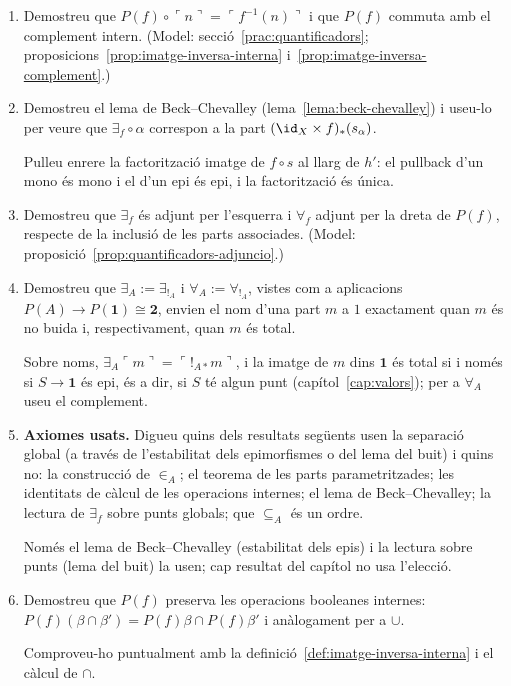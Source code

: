 \begin{enumerate}[resume]
  \item Demostreu que \(P(f)\circ\ulcorner n\urcorner=\ulcorner f^{-1}(n)\urcorner\) i que \(P(f)\) commuta amb el complement intern. (Model: secció~\ref{prac:quantificadors}; proposicions~\ref{prop:imatge-inversa-interna} i~\ref{prop:imatge-inversa-complement}.)

  \item Demostreu el lema de Beck--Chevalley (lema~\ref{lema:beck-chevalley}) i useu-lo per veure que \(\exists_f\circ\alpha\) correspon a la part \((\id_X\times f)_*(s_\alpha)\). \begin{indicacio}Pulleu enrere la factorització imatge de \(f\circ s\) al llarg de \(h'\): el pullback d'un mono és mono i el d'un epi és epi, i la factorització és única.\end{indicacio}

  \item Demostreu que \(\exists_f\) és adjunt per l'esquerra i \(\forall_f\) adjunt per la dreta de \(P(f)\), respecte de la inclusió de les parts associades. (Model: proposició~\ref{prop:quantificadors-adjuncio}.)

  \item Demostreu que \(\exists_A:=\exists_{{!}_A}\) i \(\forall_A:=\forall_{{!}_A}\), vistes com a aplicacions \(P(A)\to P(\mathbf1)\cong\mathbf2\), envien el nom d'una part \(m\) a \(1\) exactament quan \(m\) és no buida i, respectivament, quan \(m\) és total. \begin{indicacio}Sobre noms, \(\exists_A\ulcorner m\urcorner=\ulcorner{!}_{A*}m\urcorner\), i la imatge de \(m\) dins \(\mathbf1\) és total si i només si \(S\to\mathbf1\) és epi, és a dir, si \(S\) té algun punt (capítol~\ref{cap:valors}); per a \(\forall_A\) useu el complement.\end{indicacio}

  \item \textbf{Axiomes usats.} Digueu quins dels resultats següents usen la separació global (a través de l'estabilitat dels epimorfismes o del lema del buit) i quins no: la construcció de \(\in_A\); el teorema de les parts parametritzades; les identitats de càlcul de les operacions internes; el lema de Beck--Chevalley; la lectura de \(\exists_f\) sobre punts globals; que \(\subseteq_A\) és un ordre. \begin{indicacio}Només el lema de Beck--Chevalley (estabilitat dels epis) i la lectura sobre punts (lema del buit) la usen; cap resultat del capítol no usa l'elecció.\end{indicacio}

  \item Demostreu que \(P(f)\) preserva les operacions booleanes internes: \(P(f)(\beta\cap\beta')=P(f)\beta\cap P(f)\beta'\) i anàlogament per a \(\cup\). \begin{indicacio}Comproveu-ho puntualment amb la definició~\ref{def:imatge-inversa-interna} i el càlcul de \(\cap\).\end{indicacio}
\end{enumerate}
